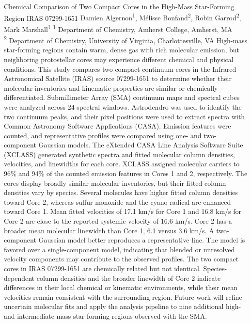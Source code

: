 \makeabstract
    {
    Chemical Comparison of Two Compact Cores in the High-Mass Star-Forming Region IRAS 07299-1651
    }
    {
    Damien Algernon\textsuperscript{1}, M\'elisse Bonfand\textsuperscript{2}, Robin Garrod\textsuperscript{2}, Mark Marshall\textsuperscript{1}
    }
    {
    \textsuperscript{1} Department of Chemistry, Amherst College, Amherst, MA\\
\textsuperscript{2} Department of Chemistry, University of Virginia, Charlottesville, VA
    }
    {
    High-mass star-forming regions contain warm, dense gas with rich molecular emission, but neighboring protostellar cores may experience different chemical and physical conditions. This study compares two compact continuum cores in the Infrared Astronomical Satellite (IRAS) source 07299-1651 to determine whether their molecular inventories and kinematic properties are similar or chemically differentiated.
    }
    {
    Submillimeter Array (SMA) continuum maps and spectral cubes were analyzed across 24 spectral windows. Astrodendro was used to identify the two continuum peaks, and their pixel positions were used to extract spectra with Common Astronomy Software Applications (CASA). Emission features were counted, and representative profiles were compared using one- and two-component Gaussian models. The eXtended CASA Line Analysis Software Suite (XCLASS) generated synthetic spectra and fitted molecular column densities, velocities, and linewidths for each core.
    }
    {
    XCLASS assigned molecular carriers to 96\% and 94\% of the counted emission features in Cores 1 and 2, respectively. The cores display broadly similar molecular inventories, but their fitted column densities vary by species. Several molecules have higher fitted column densities toward Core 2, whereas sulfur monoxide and the cyano radical are enhanced toward Core 1. Mean fitted velocities of 17.1 km/s for Core 1 and 16.8 km/s for Core 2 are close to the reported systemic velocity of 16.6 km/s. Core 2 has a broader mean molecular linewidth than Core 1, 6.1 versus 3.6 km/s. A two-component Gaussian model better reproduces a representative line. The model is favored over a single-component model, indicating that blended or unresolved velocity components may contribute to the observed profiles.
    }
    {
    The two compact cores in IRAS 07299-1651 are chemically related but not identical. Species-dependent column densities and the broader linewidth of Core 2 indicate differences in their local chemical or kinematic environments, while their mean velocities remain consistent with the surrounding region. Future work will refine uncertain molecular fits and apply the analysis pipeline to nine additional high- and intermediate-mass star-forming regions observed with the SMA.
    }

    \newpage
    